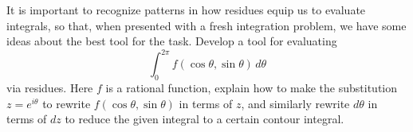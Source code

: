 \documentclass{homework}
\begin{document}
                                                                                                                                                        \begin{problem}
                                                                                                                                                          It is important to recognize patterns in how residues equip us to evaluate integrals, so that, when presented with a fresh integration problem, we have some ideas about the best tool for the task.  Develop a tool for evaluating
                                                                                                                                                            \[
                                                                                                                                                                \int_0^{2\pi} f(\cos \theta,\sin \theta) \, d\theta
                                                                                                                                                                  \]
                                                                                                                                                                    via residues.  Here $f$ is a rational function, explain how to make
                                                                                                                                                                      the substitution $z = e^{i\theta}$ to rewrite
                                                                                                                                                                        $f(\cos \theta,\sin \theta)$ in terms of $z$, and
                                                                                                                                                                          similarly rewrite $d\theta$ in terms of
                                                                                                                                                                            $dz$ to reduce the given integral to a certain contour integral.
                                                                                                                                                                            \end{problem}
\end{document}
